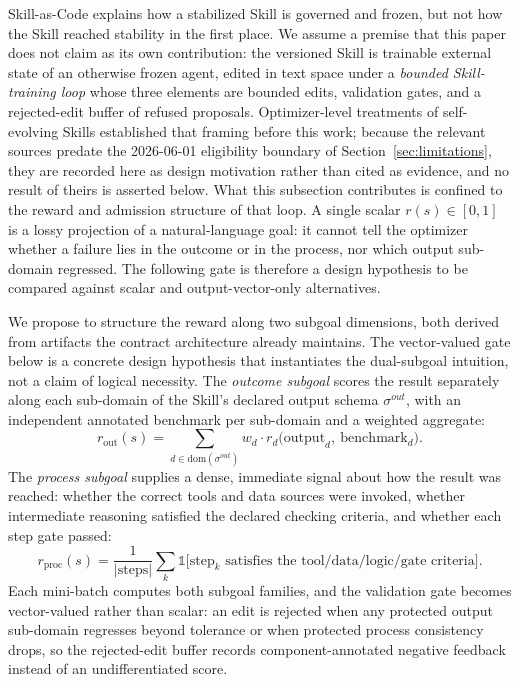 Skill-as-Code explains how a stabilized Skill is governed and frozen, but not how the Skill reached stability in the first place. We assume a premise that this paper does not claim as its own contribution: the versioned Skill is trainable external state of an otherwise frozen agent, edited in text space under a \textit{bounded Skill-training loop} whose three elements are bounded edits, validation gates, and a rejected-edit buffer of refused proposals. Optimizer-level treatments of self-evolving Skills established that framing before this work; because the relevant sources predate the 2026-06-01 eligibility boundary of Section~\ref{sec:limitations}, they are recorded here as design motivation rather than cited as evidence, and no result of theirs is asserted below. What this subsection contributes is confined to the reward and admission structure of that loop. A single scalar $r(s)\in[0,1]$ is a lossy projection of a natural-language goal: it cannot tell the optimizer whether a failure lies in the outcome or in the process, nor which output sub-domain regressed. The following gate is therefore a design hypothesis to be compared against scalar and output-vector-only alternatives.

We propose to structure the reward along two subgoal dimensions, both derived from artifacts the contract architecture already maintains. The vector-valued gate below is a concrete design hypothesis that instantiates the dual-subgoal intuition, not a claim of logical necessity. The \textit{outcome subgoal} scores the result separately along each sub-domain of the Skill's declared output schema $\sigma^{out}$, with an independent annotated benchmark per sub-domain and a weighted aggregate:
\begin{equation}
r_{\mathrm{out}}(s)=\sum_{d\in\mathrm{dom}(\sigma^{out})} w_d \cdot r_d\big(\mathrm{output}_d,\ \mathrm{benchmark}_d\big).
\end{equation}
The \textit{process subgoal} supplies a dense, immediate signal about how the result was reached: whether the correct tools and data sources were invoked, whether intermediate reasoning satisfied the declared checking criteria, and whether each step gate passed:
\begin{equation}
r_{\mathrm{proc}}(s)=\frac{1}{|\mathrm{steps}|}\sum_k \mathbb{1}\big[\mathrm{step}_k \text{ satisfies the tool/data/logic/gate criteria}\big].
\end{equation}
Each mini-batch computes both subgoal families, and the validation gate becomes vector-valued rather than scalar: an edit is rejected when any protected output sub-domain regresses beyond tolerance or when protected process consistency drops, so the rejected-edit buffer records component-annotated negative feedback instead of an undifferentiated score.

